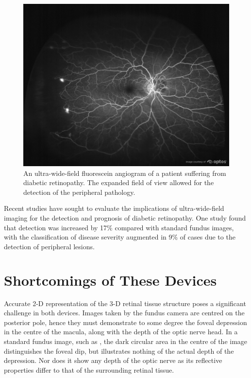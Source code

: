 \begin{figure}[H]
\centering
\includegraphics{figures/uwfdr}
\caption{An ultra-wide-field fluorescein angiogram of a patient suffering from diabetic retinopathy. The expanded field of view allowed for the detection of the peripheral pathology.\cite{1_optos.com_2015}}
\label{fig:uwfdr}
   \end{figure}

Recent studies have sought to evaluate the implications of ultra-wide-field
imaging for the detection and prognosis of diabetic retinopathy. One study
found that detection was increased by 17\% compared with standard fundus images,
with the classification of disease severity augmented in 9\% of cases due to the
detection of peripheral lesions. \cite{silva2014potential}


\section{Shortcomings of These Devices}


Accurate 2-D representation of the 3-D retinal tissue structure
poses a significant challenge in both devices. Images taken by the
fundus camera are centred on the posterior pole, hence they must
demonstrate to some degree the foveal depression in the centre of
the macula, along with the depth of the optic nerve head. In a standard
fundus image, such as , the dark circular area in the
centre of the image distinguishes the foveal dip, but illustrates
nothing of the actual depth of the depression. Nor does it show any
depth of the optic nerve as its reflective properties differ to that
of the surrounding retinal tissue.

